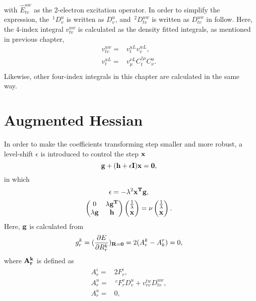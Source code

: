 \documentclass[a4paper,12pt,oneside]{book}
\newcommand{\pre}[1]{\,#1\!}
\begin{document}
with $\hat{E}_{tv}^{uw}$ as the 2-electron excitation operator. In order to simplify the expression, 
the $\pre{^1}D_v^u$ is written as $D_v^u$, and $\pre{^2}D_{tv}^{uw}$ is written as $D_{tv}^{uw}$ in follow. 
Here, the 4-index integral $v^{uw}_{tv}$ is calculated as the density fitted integrals, as mentioned in previous chapter,
\begin{equation}
\begin{aligned}
  v^{uw}_{tv} =& v^{uL}_t v^{wL}_v,\\
  v^{uL}_t =& v^{\nu L}_{\mu} C_t^{\dagger \mu} C^u_{\nu}.\\
\end{aligned}
\end{equation}
Likewise, other four-index integrals in this chapter are calculated in the same way.


\section{Augmented Hessian}
In order to make the coefficients transforming step smaller and more robust, 
a level-shift $\epsilon$ is introduced to control the step $\bf{x}$ \cite{augmentedHessian1981}
\begin{equation}
\bf{g}+(\bf{h}+\epsilon \bf{I})\bf{x}=0,
\end{equation}
in which
\begin{equation}
\epsilon =-\lambda^2\bf{x}^T\bf{g},
\end{equation}
\begin{equation}
\begin{pmatrix}
    0 & \lambda \bf{g}^T \\
    \lambda \bf{g} & \bf{h}
\end{pmatrix}
\begin{pmatrix}
    \frac{1}{\lambda} \\
    \bf{x}
\end{pmatrix}
= \nu
\begin{pmatrix}
    \frac{1}{\lambda} \\
    \bf{x}
\end{pmatrix}.
\end{equation}
Here, $\bf{g}$ is calculated from
\begin{equation}
  g_r^k = (\frac{\partial E}{\partial R_r^k})_{\bf{R = \bf{0}}} = 2(A_r^k-A_k^r) = 0,
\end{equation}
where $\bf{A}_r^k$ is defined as 
\begin{equation}
\begin{aligned}
  A_r^i=&2F_r^i,\\
  A_r^u=& \pre{^c}F_r^v D_v^u + v^{tw}_{rv}D_{tv}^{uw},\\
  A_r^a=&0,\\
\end{aligned}
\end{equation}
\end{document}
